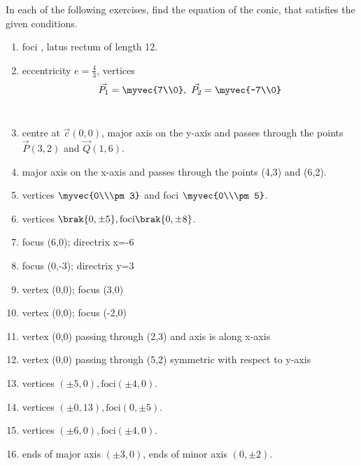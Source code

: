 In each of the following exercises, find the equation of the conic, that satisfies the given conditions.

\begin{enumerate}[label=\thesubsection.\arabic*,ref=\thesubsection.\theenumi,resume*]
\item  foci , latus rectum of length 12.
\\
\solution
		
    \item eccentricity $e = \frac{4}{3}$,
    vertices 
    \begin{align}
        \vec{P_1} = \myvec{7\\0},\ \vec{P_2} = \myvec{-7\\0}
        \label{eq:chapters/11/11/4/14/vert}
    \end{align}
\\
\solution
		
\item centre at $\vec{c}(0,0)$, major axis on the y-axis and passes through the points $\vec{P}(3,2)$ and $\vec{Q}(1,6)$.
\\
\solution

\item major axis on the x-axis and passes through the points (4,3) and (6,2).
\\
\solution

\item vertices $\myvec{0\\\pm 3}$ and foci $\myvec{0\\\pm5}$.
	\\
\solution
		
\item vertices $\brak{0,\pm 5}, \text{foci} \brak{0,\pm 8}$.  
\item focus (6,0); directrix x=-6 
\item focus (0,-3); directrix y=3
\item vertex (0,0); focus (3,0)
\item vertex (0,0); focus (-2,0) 
\item vertex (0,0) passing through (2,3) and axis is along x-axis
\item vertex (0,0) passing through (5,2) symmetric with respect to y-axis
\item vertices $(\pm5,0),\text{foci} (\pm4,0)$.
\item vertices $(\pm0,13),\text{foci} (0,\pm5)$.
\item vertices $(\pm6,0),\text{foci} (\pm4,0)$.
\item ends of major axis $(\pm3,0)$, ends of minor axis $(0,\pm2)$.

\end{enumerate}

